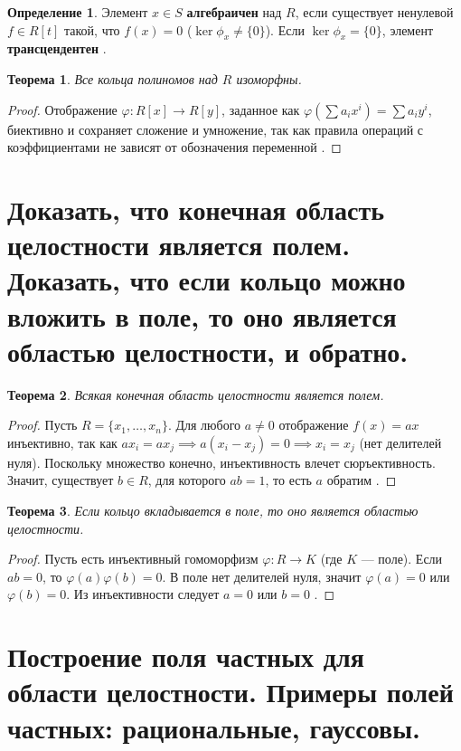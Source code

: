\documentclass[12pt, a4paper]{article}
\theoremstyle{definition}
\newtheorem{definition}{Определение}[section]
\theoremstyle{plain}
\newtheorem{theorem}{Теорема}[section]
\begin{document}
	\begin{definition}
		Элемент $x \in S$ \textbf{алгебраичен} над $R$, если существует ненулевой $f \in R[t]$ такой, что $f(x)=0$ ($\ker \phi_x \neq \{0\}$). Если $\ker \phi_x = \{0\}$, элемент \textbf{трансцендентен} .
	\end{definition}
	
	\begin{theorem}
		Все кольца полиномов над $R$ изоморфны.
	\end{theorem}
	\begin{proof}
		Отображение $\varphi: R[x] \to R[y]$, заданное как $\varphi(\sum a_i x^i) = \sum a_i y^i$, биективно и сохраняет сложение и умножение, так как правила операций с коэффициентами не зависят от обозначения переменной .
	\end{proof}
	
	\newpage
	
	\section{Доказать, что конечная область целостности является полем. Доказать, что если кольцо можно вложить в поле, то оно является областью целостности, и обратно.}
	
	\begin{theorem}
		Всякая конечная область целостности является полем.
	\end{theorem}
	\begin{proof}
		Пусть $R = \{x_1, \dots, x_n\}$. Для любого $a \neq 0$ отображение $f(x) = ax$ инъективно, так как $ax_i = ax_j \implies a(x_i - x_j) = 0 \implies x_i = x_j$ (нет делителей нуля). Поскольку множество конечно, инъективность влечет сюръективность. Значит, существует $b \in R$, для которого $ab=1$, то есть $a$ обратим .
	\end{proof}
	
	\begin{theorem}
		Если кольцо вкладывается в поле, то оно является областью целостности.
	\end{theorem}
	\begin{proof}
		Пусть есть инъективный гомоморфизм $\varphi: R \to K$ (где $K$ — поле). Если $ab=0$, то $\varphi(a)\varphi(b)=0$. В поле нет делителей нуля, значит $\varphi(a)=0$ или $\varphi(b)=0$. Из инъективности следует $a=0$ или $b=0$ .
	\end{proof}
	
	\newpage
	
	\section{Построение поля частных для области целостности. Примеры полей частных: рациональные, гауссовы.}
	
\end{document}
